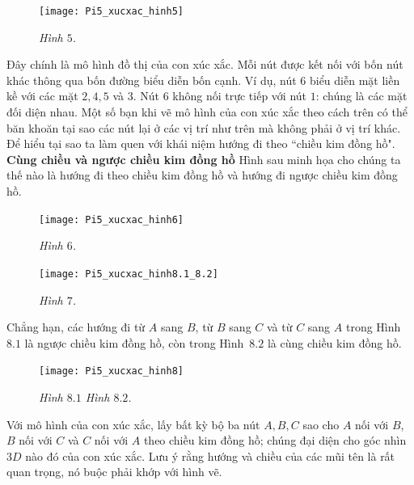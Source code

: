 \begin{multicols}{2}
	\begin{figure}[H]
		\vspace*{-5pt}
		\centering
		\captionsetup{labelformat= empty, justification=centering}
		\texttt{[image: Pi5\_xucxac\_hinh5]}
		\caption{\small\textit{\color{toancuabi}Hình $5$.}}
		\vspace*{-10pt}
	\end{figure}
	Đây chính là mô hình đồ thị của con xúc xắc. Mỗi nút được kết nối với bốn nút khác thông qua bốn đường biểu diễn bốn cạnh. Ví dụ, nút $6$ biểu diễn mặt  liền kề với các mặt $2, 4 , 5$ và $3$. Nút $6$ không nối trực tiếp với nút $1$:  chúng là các mặt đối diện nhau.
	\vskip 0.1cm
	Một số bạn khi vẽ mô hình của con xúc xắc theo cách trên có thể băn khoăn tại sao các nút lại ở các vị trí như trên mà không phải ở vị trí khác. Để hiểu tại sao ta làm quen với khái niệm hướng đi theo ``chiều kim đồng hồ".
	\vskip 0.1cm
	\textbf{\color{toancuabi}Cùng chiều và ngược chiều kim đồng hồ}
	\vskip 0.1cm
	Hình sau minh họa cho chúng ta thế nào là hướng đi theo chiều kim đồng hồ và hướng đi ngược chiều kim đồng hồ.
	\begin{figure}[H]
		\vspace*{-5pt}
		\centering
		\captionsetup{labelformat= empty, justification=centering}
		\texttt{[image: Pi5\_xucxac\_hinh6]}
		\caption{\small\textit{\color{toancuabi}Hình $6$.}}
		\vspace*{-15pt}
	\end{figure}
	\begin{figure}[H]
	\vspace*{-10pt}
	\centering
	\captionsetup{labelformat= empty, justification=centering}
	\texttt{[image: Pi5\_xucxac\_hinh8.1\_8.2]}
	\caption{\small\textit{\color{toancuabi}Hình $7$.}}
	\vspace*{-10pt}
	\end{figure}
	Chẳng hạn, các hướng đi từ $A$ sang $B$, từ $B$ sang $C$ và từ $C$ sang $A$ trong Hình $8.1$ là ngược chiều kim đồng hồ, còn trong Hình~$8.2$ là cùng chiều kim đồng hồ. 
	\begin{figure}[H]
		\vspace*{-5pt}
		\centering
		\captionsetup{labelformat= empty, justification=centering}
		\texttt{[image: Pi5\_xucxac\_hinh8]}
		\caption{\small\textit{\color{toancuabi}Hình $8.1$ \hspace*{60pt} Hình $8.2$.}}
		\vspace*{-10pt}
	\end{figure}
	Với mô hình của con xúc xắc, lấy bất kỳ bộ ba nút $A, B, C$ sao cho $A$ nối với $B$, $B$ nối với $C$ và $C$ nối với $A$ theo chiều kim đồng hồ; chúng đại diện cho góc nhìn $3D$ nào đó của con xúc xắc. Lưu ý rằng hướng và chiều của các mũi tên là rất quan trọng, nó buộc phải khớp với hình vẽ.  

\end{multicols}
